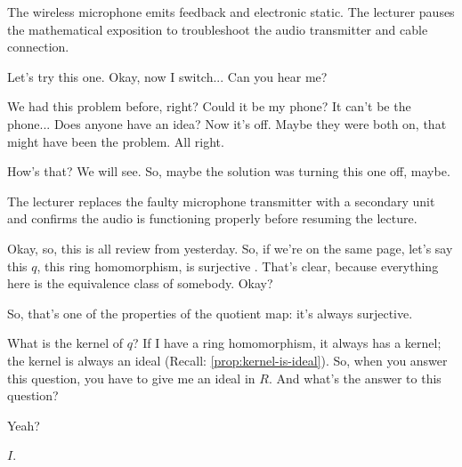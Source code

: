 \begin{note}
The wireless microphone emits feedback and electronic static. The lecturer pauses the mathematical exposition to troubleshoot the audio transmitter and cable connection.
\end{note}

\begin{speech}[00:04:21 - 00:05:34]
Let's try this one.  Okay, now I switch... Can you hear me?

We had this problem before, right? Could it be my phone? It can't be the phone...  Does anyone have an idea? Now it's off. Maybe they were both on, that might have been the problem. All right.

How's that? We will see. So, maybe the solution was turning this one off, maybe.
\end{speech}

\begin{note}
The lecturer replaces the faulty microphone transmitter with a secondary unit and confirms the audio is functioning properly before resuming the lecture.
\end{note}

\begin{speech}[00:05:35 - 00:06:17]
Okay, so, this is all review from yesterday. So, if we're on the same page, let's say this $q$, this ring homomorphism, is surjective . That's clear, because everything here is the equivalence class of somebody. Okay?

So, that's one of the properties of the quotient map: it's always surjective.

What is the kernel of $q$?  If I have a ring homomorphism, it always has a kernel; the kernel is always an ideal (Recall: \cref{prop:kernel-is-ideal}). So, when you answer this question, you have to give me an ideal in $R$. And what's the answer to this question?

Yeah?
\end{speech}

\begin{student}
$I$.
\end{student}

